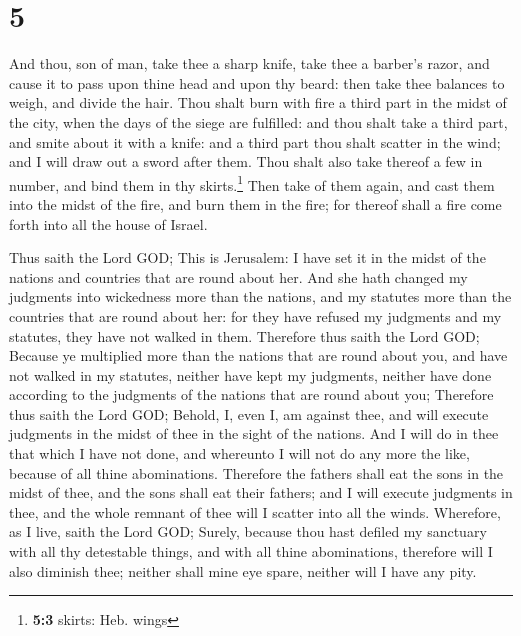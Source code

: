 \hypertarget{section-4}{%
\section{5}\label{section-4}}

 And thou, son of man, take thee a sharp knife, take thee
a barber's razor, and cause it to pass upon thine head and upon thy
beard: then take thee balances to weigh, and divide the hair.
 Thou shalt burn with fire a third part in the midst of
the city, when the days of the siege are fulfilled: and thou shalt take
a third part, and smite about it with a knife: and a third part thou
shalt scatter in the wind; and I will draw out a sword after them.
 Thou shalt also take thereof a few in number, and bind
them in thy skirts.\footnote{\textbf{5:3} skirts: Heb. wings}
 Then take of them again, and cast them into the midst of
the fire, and burn them in the fire; for thereof shall a fire come forth
into all the house of Israel.

 Thus saith the Lord GOD; This is Jerusalem: I have set it
in the midst of the nations and countries that are round about her.
 And she hath changed my judgments into wickedness more
than the nations, and my statutes more than the countries that are round
about her: for they have refused my judgments and my statutes, they have
not walked in them.  Therefore thus saith the Lord GOD;
Because ye multiplied more than the nations that are round about you,
and have not walked in my statutes, neither have kept my judgments,
neither have done according to the judgments of the nations that are
round about you;  Therefore thus saith the Lord GOD;
Behold, I, even I, am against thee, and will execute judgments in the
midst of thee in the sight of the nations.  And I will do
in thee that which I have not done, and whereunto I will not do any more
the like, because of all thine abominations.  Therefore
the fathers shall eat the sons in the midst of thee, and the sons shall
eat their fathers; and I will execute judgments in thee, and the whole
remnant of thee will I scatter into all the winds. 
Wherefore, as I live, saith the Lord GOD; Surely, because thou hast
defiled my sanctuary with all thy detestable things, and with all thine
abominations, therefore will I also diminish thee; neither shall mine
eye spare, neither will I have any pity.

